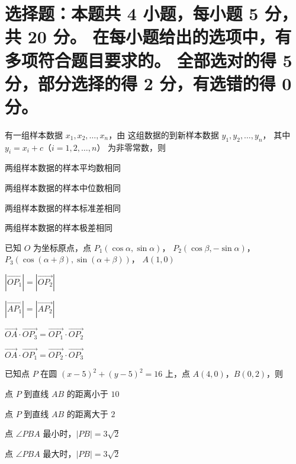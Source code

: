 \documentclass{exam-zh}
\begin{document}
\section{%
  选择题：本题共 4 小题，每小题 5 分，共 20 分。
  在每小题给出的选项中，有多项符合题目要求的。
  全部选对的得 5 分，部分选择的得 2 分，有选错的得 0 分。
}

\begin{question}
  有一组样本数据 $x_1, x_2, \dots, x_n$，由 这组数据的到新样本数据 $y_1, y_2, \dots, y_n$，
  其中 $y_i = x_i + c$（$i = 1, 2, \dots, n$） 为非零常数，则 \paren
  \begin{choices}
    \item 两组样本数据的样本平均数相同
    \item 两组样本数据的样本中位数相同
    \item 两组样本数据的样本标准差相同
    \item 两组样本数据的样本极差相同
  \end{choices}
\end{question}

\begin{question}
  已知 $O$ 为坐标原点，点
  $P_1(\cos\alpha,  \sin\alpha)$，
  $P_2(\cos\beta , -\sin\alpha)$，
  $P_3(\cos(\alpha + \beta),  \sin(\alpha + \beta))$，
  $A(1, 0)$ \paren
  \begin{choices}
    \item $|\overrightarrow{OP_1}| = |\overrightarrow{OP_2}|$
    \item $|\overrightarrow{AP_1}| = |\overrightarrow{AP_2}|$
    \item $\overrightarrow{OA} \cdot \overrightarrow{OP_3}
      = \overrightarrow{OP_1} \cdot \overrightarrow{OP_2}$
    \item $\overrightarrow{OA} \cdot \overrightarrow{OP_1}
      = \overrightarrow{OP_2} \cdot \overrightarrow{OP_3}$
  \end{choices}
\end{question}

\begin{question}
  已知点 $P$ 在圆 $(x - 5)^2 + (y - 5)^2 = 16$ 上，点 $A(4, 0)$，$B(0, 2)$，则 \paren
  \begin{choices}
    \item 点 $P$ 到直线 $AB$ 的距离小于 $10$
    \item 点 $P$ 到直线 $AB$ 的距离大于 $2$
    \item 点 $\angle PBA$ 最小时，$|PB| = 3 \sqrt{2}$
    \item 点 $\angle PBA$ 最大时，$|PB| = 3 \sqrt{2}$
  \end{choices}
\end{question}
\end{document}
